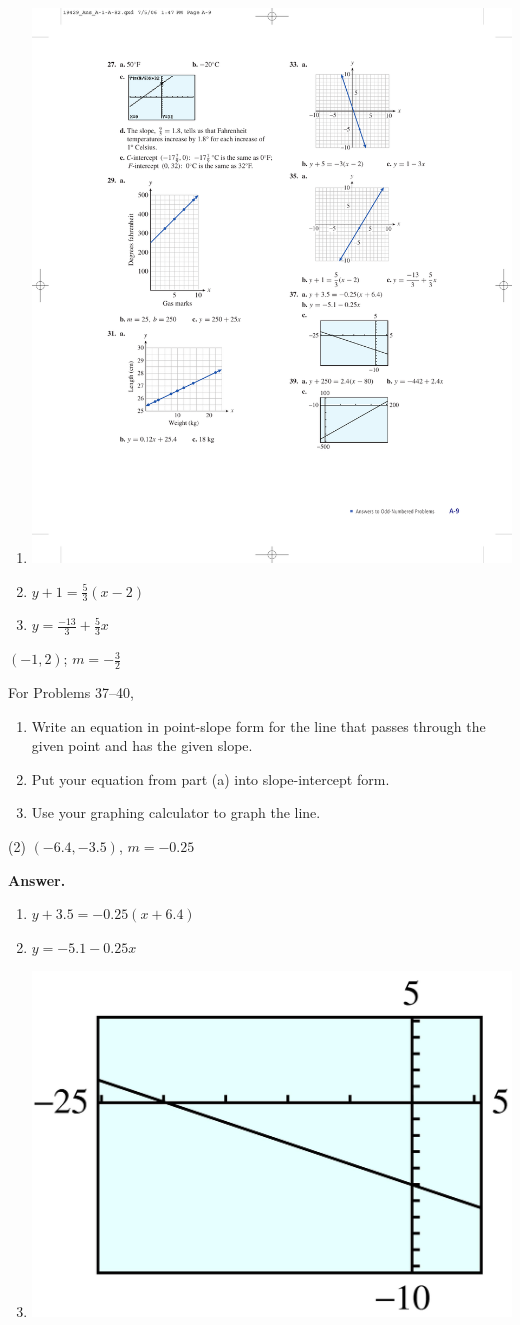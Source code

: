 \documentclass[10pt,]{book}
\theoremstyle{plain}
\theoremstyle{definition}
\theoremstyle{definition}
\theoremstyle{definition}
\theoremstyle{definition}
\numberwithin{equation}{part}
\begin{document}
\begin{exerciselist}
\begin{exercisegroup}
\begin{enumerate}[label=*\alph**]
\item\hypertarget{li-1215}{}\includegraphics[width=0.5\linewidth]{images/fig-ans-1-5-35}
%
\item\hypertarget{li-1216}{}\(y + 1 = \frac{5}{3}(x - 2)\)%
\item\hypertarget{li-1217}{}\(y = \frac{-13}{3} + \frac{5}{3}x\)%
\end{enumerate}
%
\exercise[36.]\hypertarget{exercise-322}{}\((-1, 2)\); \(m =-\frac{3}{2} \)%
\end{exercisegroup}
\par\smallskip\noindent
\hypertarget{exercisegroup-40}{}\par\noindent For Problems 37–40, \leavevmode%
\begin{enumerate}[label=*\alph**]
\item\hypertarget{li-1218}{}Write an equation in point-slope form for the line that passes through the given point and has the given slope.%
\item\hypertarget{li-1219}{}Put your equation from part (a) into slope-intercept form.%
\item\hypertarget{li-1220}{}Use your graphing calculator to graph the line.%
\end{enumerate}
%
\begin{exercisegroup}(2)
\exercise[37.]\hypertarget{exercise-323}{}\((-6.4, -3.5)\), \(m =-0.25 \)%
\par\smallskip
\noindent\textbf{Answer.}\hypertarget{answer-182}{}\quad
\leavevmode%
\begin{enumerate}[label=*\alph**]
\item\hypertarget{li-1221}{}\(y + 3.5 = -0.25(x + 6.4)\)%
\item\hypertarget{li-1222}{}\(y = -5.1 - 0.25x\)%
\item\hypertarget{li-1223}{}\includegraphics[width=0.4\linewidth]{images/fig-ans-1-5-37.jpg}

\end{enumerate}
\end{exercisegroup}
\end{exerciselist}
\end{document}
